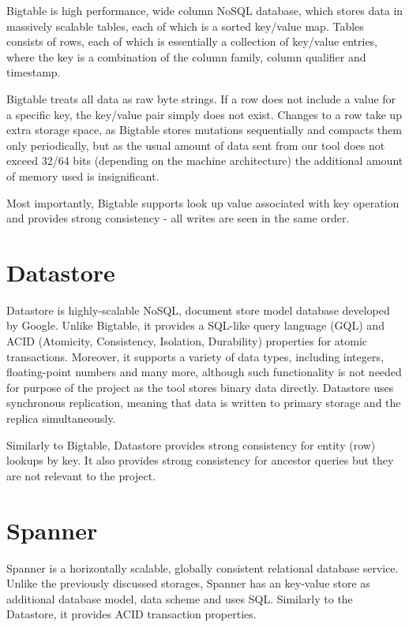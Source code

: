 \documentclass[bsc,frontabs,twoside,singlespacing,parskip,deptreport]{infthesis}     %
\begin{document}
Bigtable \citep{google-bigtable} is high performance, wide column NoSQL database, which stores data in massively scalable tables, each of which is a sorted key/value map. Tables consists of rows, each of which is essentially a collection of key/value entries, where the key is a combination of the column family, column qualifier and timestamp. 

Bigtable treats all data as raw byte strings. If a row does not include a value for a specific key, the key/value pair simply does not exist. Changes to a row take up extra storage space, as Bigtable stores mutations sequentially and compacts them only periodically, but as the usual amount of data sent from our tool does not exceed 32/64 bits (depending on the machine architecture) the additional amount of memory used is insignificant. 

Most importantly, Bigtable supports look up value associated with key operation and provides strong consistency - all writes are seen in the same order.

\section{Datastore}

Datastore \citep{google-datastore} is highly-scalable NoSQL, document store model database developed by Google. Unlike Bigtable, it provides a SQL-like query language (GQL) and ACID (Atomicity, Consistency, Isolation, Durability) properties for atomic transactions. Moreover, it supports a variety of data types, including integers, floating-point numbers and many more, although such functionality is not needed for purpose of the project as the tool stores binary data directly. Datastore uses synchronous replication, meaning that data is written to primary storage and the replica simultaneously.

Similarly to Bigtable, Datastore provides strong consistency for entity (row) lookups by key. It also provides strong consistency for ancestor queries but they are not relevant to the project.

\section{Spanner}

Spanner \citep{google-spanner} is a horizontally scalable, globally consistent relational database service. Unlike the previously discussed storages, Spanner has an key-value store as additional database model, data scheme and uses SQL. Similarly to the Datastore, it provides ACID transaction properties.
\end{document}
